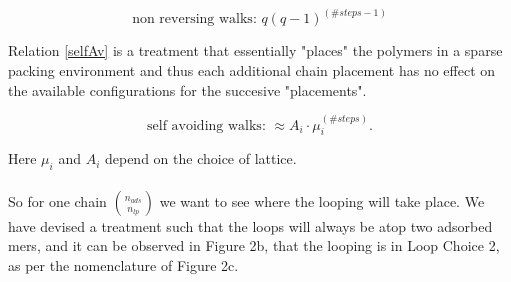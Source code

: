 \documentclass[10pt,letterpaper]{article}
\begin{document}
\begin{equation}
	\text{non reversing walks:  } q(q-1)^{(\#steps-1)}
	\label{nonRev}
\end{equation}

\newpage
\noindent Relation \ref{selfAv} is a treatment that essentially "places" the polymers in a sparse packing environment and thus each additional chain placement has no effect on the available configurations for the succesive "placements".

\begin{equation}
	\text{self avoiding walks:  } \approx A_i\cdot\mu_i^{(\#steps)}.
	\label{selfAv}
\end{equation}


\noindent Here $\mu_i$ and $A_i$ depend on the choice of lattice\cite{Chen2002,Madras2013}.\\\\

\noindent So for one chain  $\binom{n_{ads}}{n_{lp}}$ we want to see where the looping will take place. We have devised a treatment such that the loops will always be atop two adsorbed mers, and it can be observed in Figure 2b, that the looping is in Loop Choice 2, as per the nomenclature of Figure 2c.
\end{document}
